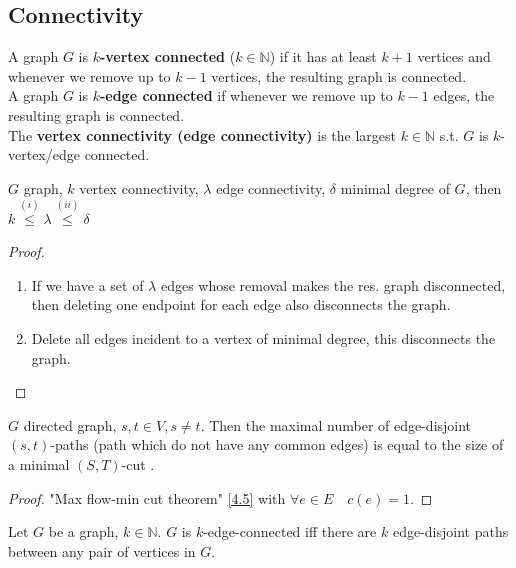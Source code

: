 \subsection{Connectivity}
\begin{definition}\label{4.8}
    A graph $G$ is \textbf{$k$-vertex connected} ($k\in\mathbb{N}$) if it has at least $k+1$ vertices and whenever we remove up to $k-1$ vertices, the resulting graph is connected.\\
    A graph $G$ is \textbf{$k$-edge connected} if whenever we remove up to $k-1$ edges, the resulting graph is connected.\\
    The \textbf{vertex connectivity (edge connectivity)} is the largest $k\in\mathbb{N}$ s.t. $G$ is $k$-vertex/edge connected.
\end{definition}
\begin{remark}\label{4.9}
    $G$ graph, $k$ vertex connectivity, $\lambda$ edge connectivity, $\delta$ minimal degree of $G$, then $k\stackrel{(i)}{\leq}\lambda\stackrel{(ii)}{\leq}\delta$
\end{remark}
\begin{proof}
    \begin{enumerate}
        \item If we have a set of $\lambda$ edges whose removal makes the res. graph disconnected, then deleting one endpoint for each edge also disconnects the graph.
        \item Delete all edges incident to a vertex of minimal degree, this disconnects the graph.
    \end{enumerate}
\end{proof}
\begin{lemma}\label{4.10}
    $G$ directed graph, $s,t\in V,s\neq t$. Then the maximal number of edge-disjoint $(s,t)$-paths (path which do not have any common edges) is equal to the size of a minimal $(S,T)$-cut .
\end{lemma}
\begin{proof}
    "Max flow-min cut theorem" \ref{4.5} with $\forall e\in E\quad c(e)=1$.
\end{proof}
\begin{theorem}\label{4.11}
    Let $G$ be a graph, $k\in\mathbb{N}$. $G$ is $k$-edge-connected iff there are $k$ edge-disjoint paths between any pair of vertices in $G$.
\end{theorem}
